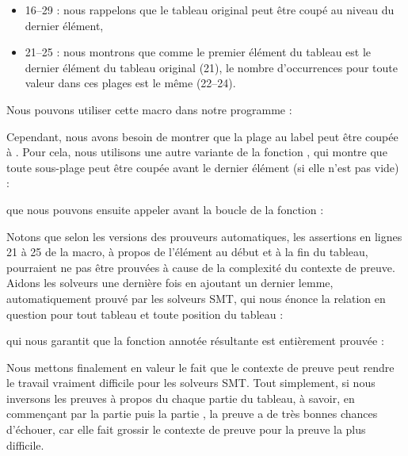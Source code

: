\begin{itemize}
    \item 16--29 : nous rappelons que le tableau original peut être coupé au
          niveau du dernier élément,
    \item 21--25 : nous montrons que comme le premier élément du tableau est le
          dernier élément du tableau original (21), le nombre d'occurrences pour
          toute valeur dans ces plages est le même (22--24).
\end{itemize}


Nous pouvons utiliser cette macro dans notre programme :




Cependant, nous avons besoin de montrer que la plage au label  peut
être coupée à  . Pour cela, nous utilisons une autre variante de la
fonction , qui montre que toute sous-plage peut être coupée avant
le dernier élément (si elle n'est pas vide) :




que nous pouvons ensuite appeler avant la boucle de la fonction  :




Notons que selon les versions des prouveurs automatiques, les assertions en lignes
21 à 25 de la macro, à propos de l'élément au début et à la fin du tableau,
pourraient ne pas être prouvées à cause de la complexité du contexte de preuve.
Aidons les solveurs une dernière fois en ajoutant un dernier lemme, automatiquement
prouvé par les solveurs SMT, qui nous énonce la relation en question pour tout
tableau et toute position du tableau :




qui nous garantit que la fonction annotée résultante est entièrement prouvée :




Nous mettons finalement en valeur le fait que le contexte de preuve peut rendre
le travail vraiment difficile pour les solveurs SMT. Tout simplement, si nous
inversons les preuves à propos du chaque partie du tableau, à savoir, en
commençant par la partie  puis la partie ,
la preuve a de très bonnes chances d'échouer, car elle fait grossir le contexte de
preuve pour la preuve la plus difficile.


